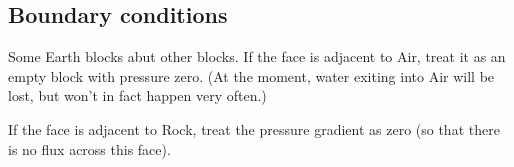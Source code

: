 \documentclass[10pt, a4paper, twocolumn]{article}
\begin{document}
\subsection{Boundary conditions}\label{sec:boundary}

Some Earth blocks abut other blocks. If the face is adjacent to Air,
treat it as an empty block with pressure zero. (At the moment, water
exiting into Air will be lost, but won't in fact happen very often.)

If the face is adjacent to Rock, treat the pressure gradient as zero
(so that there is no flux across this face).
\end{document}
